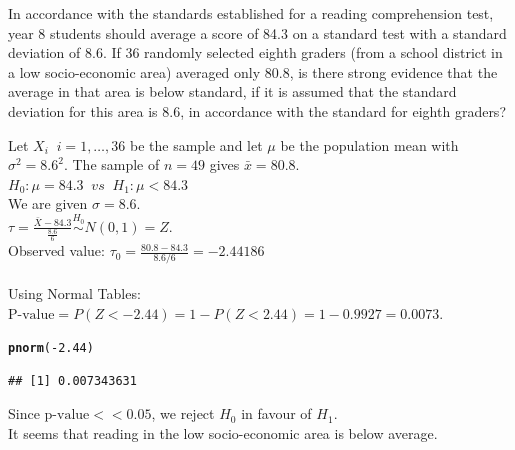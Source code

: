 \documentclass[bigtut]{tutorial}\usepackage[]{graphicx}\usepackage[]{color}
\makeatletter
\newcommand{\hlnum}[1]{\textcolor[rgb]{0.686,0.059,0.569}{#1}}%
\newcommand{\hlopt}[1]{\textcolor[rgb]{0,0,0}{#1}}%
\newcommand{\hlstd}[1]{\textcolor[rgb]{0.345,0.345,0.345}{#1}}%
\newcommand{\hlkwd}[1]{\textcolor[rgb]{0.737,0.353,0.396}{\textbf{#1}}}%
\newenvironment{kframe}{%
 \def\at@end@of@kframe{}%
 \ifinner\ifhmode%
  \def\at@end@of@kframe{\end{minipage}}%
  \begin{minipage}{\columnwidth}%
 \fi\fi%
 \def\FrameCommand##1{\hskip\@totalleftmargin \hskip-\fboxsep
 \colorbox{shadecolor}{##1}\hskip-\fboxsep
     \hskip-\linewidth \hskip-\@totalleftmargin \hskip\columnwidth}%
 \MakeFramed {\advance\hsize-\width
   \@totalleftmargin\z@ \linewidth\hsize
   \@setminipage}}%
 {\par\unskip\endMakeFramed%
 \at@end@of@kframe}
\newenvironment{knitrout}{}{} %
\makeatother
\begin{document}
\begin{tutorial}
\begin{questions}
\begin{solution}
\end{solution}



\question

In accordance with the standards established for a reading comprehension test, year 8 students should average a score of 84.3 on a standard test with a standard deviation of 8.6. If 36 randomly selected eighth graders (from a school district in a low socio-economic area) averaged only 80.8, is there strong evidence that the average in that area is below standard, if it is assumed that the standard deviation for this area is 8.6, in accordance with the standard for eighth graders?


\begin{solution}
Let $X_{i} \;\; i=1,\ldots,36$ be the sample and let $\mu$ be the population mean with $\sigma^2=8.6^2$. The sample of $n=49$ gives $\bar{x} = 80.8$.\\

$H_0: \mu=84.3  \;\; vs \;\; H_1: \mu < 84.3$ \\

We are given $\sigma = 8.6$. \\

$\tau = \frac{ \bar{X} - 84.3}{\frac{8.6}{6}} \overset{H_0}{\sim} N(0,1) = Z$. \\
Observed value: $\tau_{0} = \frac{80.8-84.3}{8.6/6} = -2.44186$ \\

 \\

Using Normal Tables: \\
$\text{P-value} = P( Z < -2.44) = 1-P(Z < 2.44) = 1-0.9927  = 0.0073$. \\

\begin{knitrout}
\color{fgcolor}\begin{kframe}
\begin{alltt}
\hlkwd{pnorm}\hlstd{(}\hlopt{-}\hlnum{2.44}\hlstd{)}
\end{alltt}
\begin{verbatim}
## [1] 0.007343631
\end{verbatim}
\end{kframe}
\end{knitrout}

\vspace{.5cm}
Since $\text{p-value} << 0.05$, we reject $H_{0}$ in favour of $H_{1}$. \\
It seems that reading in the low socio-economic area is below average.
\end{solution}



\end{questions}
\end{tutorial}
\end{document}
